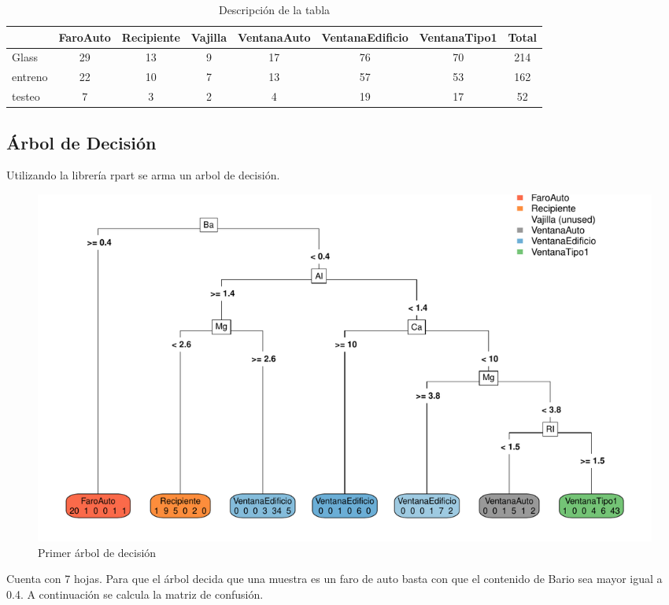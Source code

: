 \begin{table}[H]
  \centering

  \begin{tabular}{lccccccc}
    \toprule
    & FaroAuto & Recipiente & Vajilla & VentanaAuto & VentanaEdificio & VentanaTipo1 & Total\\
    \midrule
    Glass & 29 & 13 & 9 & 17 & 76 & 70 & 214\\
    entreno & 22 & 10 & 7 & 13 & 57 & 53 & 162\\
    testeo & 7 & 3 & 2 & 4 & 19 & 17 & 52\\
    \bottomrule
  \end{tabular}
    \caption{Descripción de la tabla}
  \label{tabla_ejemplo}
\end{table}



\subsection{Árbol de Decisión}
Utilizando la librería rpart se arma un arbol de decisión. 
\begin{figure}[H]
	\centering
	\includegraphics[width=\linewidth]{../Ejercicio-2/ImagenesEjercicio2/add.pdf}
	\caption{Primer árbol de decisión}	
	\label{fig:add11}
\end{figure}
Cuenta con 7 hojas. Para que el árbol decida que una muestra es un faro de auto basta con que el contenido de Bario sea mayor igual a 0.4. A continuación se calcula la matriz de confusión.


